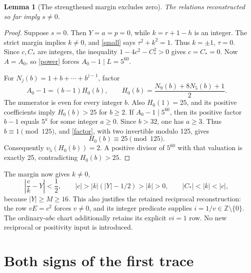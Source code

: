 \documentclass[11pt]{article}
\newtheorem{lemma}[theorem]{Lemma}
\newcommand{\Z}{\mathbb Z}\newcommand{\Q}{\mathbb Q}
\begin{document}
\begin{lemma}[The strengthened margin excludes zero]\label{nonzero}
The relations reconstructed so far imply \(s\ne0\).
\end{lemma}
\begin{proof}
Suppose \(s=0\). Then \(Y=a=p=0\), while \(k=r+1-h\)
is an integer. The strict margin implies \(k\ne0\), and
\eqref{small} says \(\tau^2+k^2=1\). Thus \(k=\pm1\),
\(\tau=0\). Since \(c,C_*\) are integers, the inequality
\(1-4c^2-C_*^2>0\) gives \(c=C_*=0\). Now \(A=A_0\),
so \eqref{power} forces \(A_0-1\mid L=5^{60}\).

For \(N_j(b)=1+b+\cdots+b^{j-1}\), factor
\begin{equation}\label{factor}
 A_0-1=(b-1)H_0(b),\qquad
 H_0(b)=\frac{N_9(b)+8N_5(b)+1}{2}.
\end{equation}
The numerator is even for every integer \(b\). Also \(H_0(1)=25\),
and its positive coefficients imply \(H_0(b)>25\) for \(b\ge2\).
If \(A_0-1\mid5^{60}\), then its positive factor \(b-1\)
equals \(5^a\) for some integer \(a\ge0\). Since \(b>32\),
one has \(a\ge3\). Thus \(b\equiv1\pmod{125}\), and
\eqref{factor}, with two invertible modulo 125, gives
\[
                        H_0(b)\equiv25\pmod{125}.
\]
Consequently \(v_5(H_0(b))=2\). A positive divisor of \(5^{60}\)
with that valuation is exactly 25, contradicting \(H_0(b)>25\).
\end{proof}

The margin now gives \(k\ne0\),
\begin{equation}\label{half}
 \left|\frac ck-Y\right|<\frac12,\qquad
 |c|>|k|(|Y|-1/2)>|k|>0,
 \qquad |C_*|<|k|<|c|,
\end{equation}
because \(|Y|\ge M\ge16\). This also justifies the retained
reciprocal reconstruction: the row \(vE=c^2\) forces \(v\ne0\),
and its integer predicate supplies \(i=1/v\in\Z\setminus\{0\}\).
The ordinary-\(abc\) chart additionally retains its explicit
\(vi=1\) row. No new reciprocal or positivity input is introduced.

\section{Both signs of the first trace}
\end{document}
